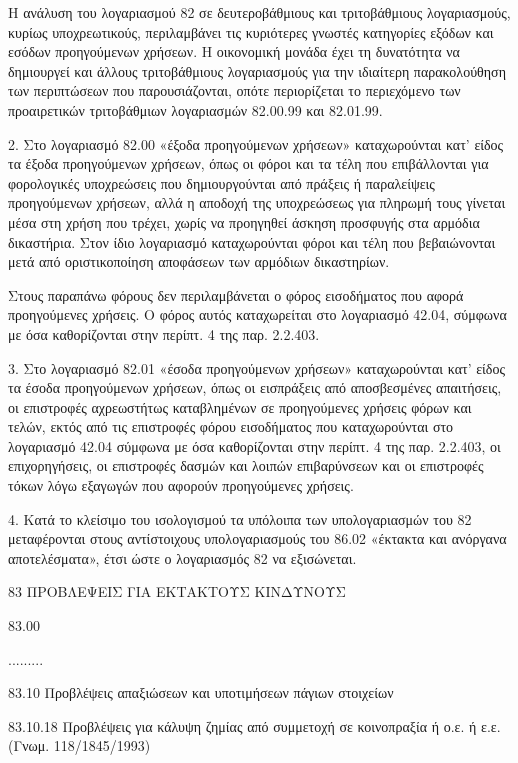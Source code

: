 \documentclass[A4,10pt,greek]{book}
\begin{document}
Η ανάλυση του λογαριασμού 82 σε δευτεροβάθμιους και τριτοβάθμιους λογαριασμούς, κυρίως υποχρεωτικούς, περιλαμβάνει τις κυριότερες γνωστές κατηγορίες εξόδων και εσόδων προηγούμενων χρήσεων. Η οικονομική μονάδα έχει τη δυνατότητα να δημιουργεί και άλλους τριτοβάθμιους λογαριασμούς για την ιδιαίτερη παρακολούθηση των περιπτώσεων που παρουσιάζονται, οπότε περιορίζεται το περιεχόμενο των προαιρετικών τριτοβάθμιων λογαριασμών 82.00.99 και 82.01.99.

2. Στο λογαριασμό 82.00 «έξοδα προηγούμενων χρήσεων» καταχωρούνται κατ' είδος τα έξοδα προηγούμενων χρήσεων, όπως οι φόροι και τα τέλη που επιβάλλονται για φορολογικές υποχρεώσεις που δημιουργούνται από πράξεις ή παραλείψεις προηγούμενων χρήσεων, αλλά η αποδοχή της υποχρεώσεως για πληρωμή τους γίνεται μέσα στη χρήση που τρέχει, χωρίς να προηγηθεί άσκηση προσφυγής στα αρμόδια δικαστήρια. Στον ίδιο λογαριασμό καταχωρούνται φόροι και τέλη που βεβαιώνονται μετά από οριστικοποίηση αποφάσεων των αρμόδιων δικαστηρίων.

Στους παραπάνω φόρους δεν περιλαμβάνεται ο φόρος εισοδήματος που αφορά προηγούμενες χρήσεις. Ο φόρος αυτός καταχωρείται στο λογαριασμό 42.04, σύμφωνα με όσα καθορίζονται στην περίπτ. 4 της παρ. 2.2.403.

3. Στο λογαριασμό 82.01 «έσοδα προηγούμενων χρήσεων» καταχωρούνται κατ' είδος τα έσοδα προηγούμενων χρήσεων, όπως οι εισπράξεις από αποσβεσμένες απαιτήσεις, οι επιστροφές αχρεωστήτως καταβλημένων σε προηγούμενες χρήσεις φόρων και τελών, εκτός από τις επιστροφές φόρου εισοδήματος που καταχωρούνται στο λογαριασμό 42.04 σύμφωνα με όσα καθορίζονται στην περίπτ. 4 της παρ. 2.2.403, οι επιχορηγήσεις, οι επιστροφές δασμών και λοιπών επιβαρύνσεων και οι επιστροφές τόκων λόγω εξαγωγών που αφορούν προηγούμενες χρήσεις.

4. Κατά το κλείσιμο του ισολογισμού τα υπόλοιπα των υπολογαριασμών του 82 μεταφέρονται στους αντίστοιχους υπολογαριασμούς του 86.02 «έκτακτα και ανόργανα αποτελέσματα», έτσι ώστε ο λογαριασμός 82 να εξισώνεται.

 83    ΠΡΟΒΛΕΨΕΙΣ ΓΙΑ ΕΚΤΑΚΤΟΥΣ ΚΙΝΔΥΝΟΥΣ

        83.00

        .........

        83.10    Προβλέψεις απαξιώσεων και υποτιμήσεων πάγιων στοιχείων

                     83.10.18    Προβλέψεις για κάλυψη ζημίας από συμμετοχή σε κοινοπραξία
                                       ή ο.ε. ή ε.ε. (Γνωμ. 118/1845/1993)
\end{document}

